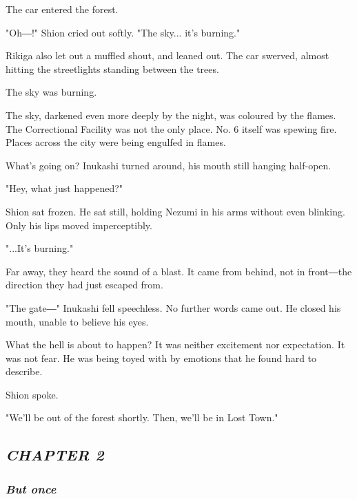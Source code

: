 The car entered the forest.

"Oh―!" Shion cried out softly. "The sky... it's burning."

Rikiga also let out a muffled shout, and leaned out. The car swerved,
almost hitting the streetlights standing between the trees.

The sky was burning.

The sky, darkened even more deeply by the night, was coloured by the
flames. The Correctional Facility was not the only place. No. 6 itself
was spewing fire. Places across the city were being engulfed in flames.

What's going on? Inukashi turned around, his mouth still hanging
half-open.

"Hey, what just happened?"

Shion sat frozen. He sat still, holding Nezumi in his arms without even
blinking. Only his lips moved imperceptibly.

"...It's burning."

Far away, they heard the sound of a blast. It came from behind, not in
front―the direction they had just escaped from.

"The gate―" Inukashi fell speechless. No further words came out. He
closed his mouth, unable to believe his eyes.

What the hell is about to happen? It was neither excitement nor
expectation. It was not fear. He was being toyed with by emotions that
he found hard to describe.

Shion spoke.

"We'll be out of the forest shortly. Then, we'll be in Lost Town."

\hypertarget{index_split_001.htmlux5cux23calibre_pb_2}{}

\protect\hypertarget{index_split_002.html}{}{}

\hypertarget{index_split_002.htmlux5cux23calibre_pb_0}{}

\hypertarget{index_split_002.htmlux5cux23calibre_toc_3}{%
\subsection{\texorpdfstring{\emph{CHAPTER
2}}{CHAPTER 2}}\label{index_split_002.htmlux5cux23calibre_toc_3}}

\subsubsection{\texorpdfstring{\emph{But once}}{But once}}

